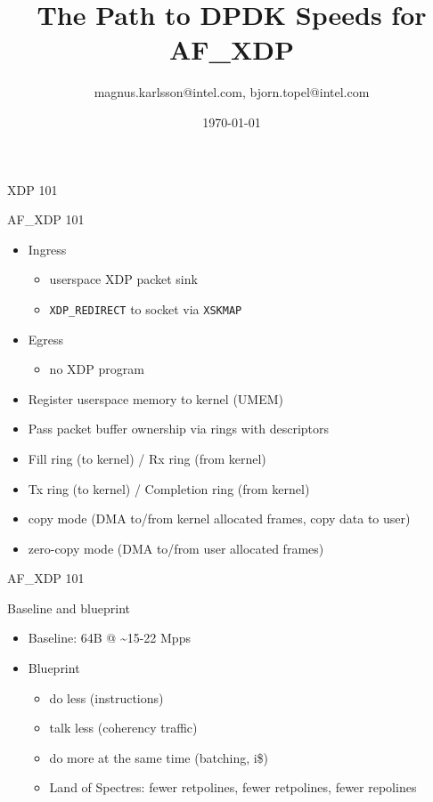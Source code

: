 \documentclass{beamer}
\title{The Path to DPDK Speeds for AF\_XDP}
\date{\today}
\author{magnus.karlsson@intel.com, bjorn.topel@intel.com}
\institute{LPC 2018}
\begin{document}
  \maketitle

  \begin{frame}{XDP 101}
    \resizebox{\textwidth}{!}{}
  \end{frame}
  \begin{frame}{AF\_XDP 101}
    \begin{itemize}
    \item Ingress
      \begin{itemize}
      \item userspace XDP packet sink
      \item {\tt XDP\_REDIRECT} to socket via {\tt XSKMAP}
      \end{itemize}
    \item Egress
      \begin{itemize}
      \item no XDP program
      \end{itemize}
    \item Register userspace memory to kernel (UMEM)
    \item Pass packet buffer ownership via rings with descriptors
    \item Fill ring (to kernel) / Rx ring (from kernel)
    \item Tx ring (to kernel) / Completion ring (from kernel)
    \item copy mode (DMA to/from kernel allocated frames, copy data to user)
    \item zero-copy mode (DMA to/from user allocated frames)
    \end{itemize}
  \end{frame}
  \begin{frame}{AF\_XDP 101}
    \resizebox{\textwidth}{!}{}
  \end{frame}

  \begin{frame}{Baseline and blueprint}
      \begin{itemize}
      \item Baseline: 64B @ \textasciitilde15-22 Mpps
      \item Blueprint
      \begin{itemize}
        \item do less (instructions)
        \item talk less (coherency traffic)
        \item do more at the same time (batching, i\$)
        \item Land of Spectres: fewer retpolines, fewer retpolines,
          fewer repolines
      \end{itemize}

      \end{itemize}
  \end{frame}
\end{document}
